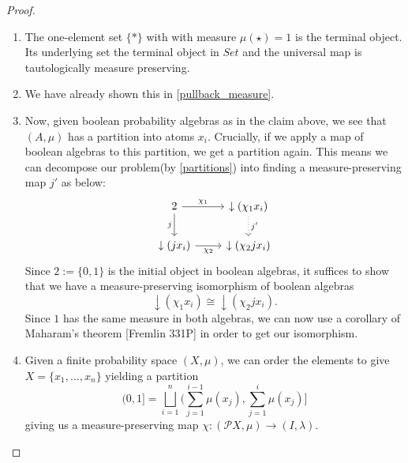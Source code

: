 \documentclass[a4paper]{amsproc}
\theoremstyle{plain}
\theoremstyle{definition}
\theoremstyle{remark}
\numberwithin{equation}{section}
\begin{document}
\begin{proof} 
\begin{enumerate}
\item The one-element set $\{*\}$ with with measure $\mu(\star)=1$ is the terminal object. Its underlying set the terminal object in $Set$ and the universal map is tautologically measure preserving.
\item We have already shown this in \ref{pullback_measure}.
\item
Now, given boolean probability algebras as in the claim above, we see that $(A, \mu)$ has a partition into atoms $x_i$. Crucially, if we apply a map of boolean algebras to this partition, we get a partition again. This means we can decompose our problem(by \ref{partitions}) into finding a measure-preserving map $j'$ as below:
\[
\begin{tikzcd}
2 \arrow[d, "j"'] \arrow[r, "\chi_1"]  & \downarrow(\chi_1 x_i) \arrow[d, "j'", dotted] \\
\downarrow(j x_i) \arrow[r, "\chi_2"'] & \downarrow(\chi_2 j x_i)                      
\end{tikzcd}
\]
Since $2 := \{0, 1\}$ is the initial object in boolean algebras, it suffices to show that we have a measure-preserving isomorphism of boolean algebras
\[
\downarrow(\chi_1 x_i) \cong \downarrow(\chi_2 j x_i).
\]
Since $1$ has the same measure in both algebras, we can now use a corollary of Maharam's theorem [Fremlin 331P] in order to get our isomorphism.

\item Given a finite probability space $(X,\mu)$, we can order the elements to give $X=\{x_1,...,x_n\}$ yielding a partition
\[ (0,1]=\bigsqcup_{i=1}^n (\sum_{j=1}^{i-1} \mu(x_j), \sum_{j=1}^{i} \mu(x_j)]\]
giving us a measure-preserving map $\chi:(\mathcal{P} X,\mu)\rightarrow (I,\lambda)$.


\end{enumerate}
\end{proof}
\end{document}
